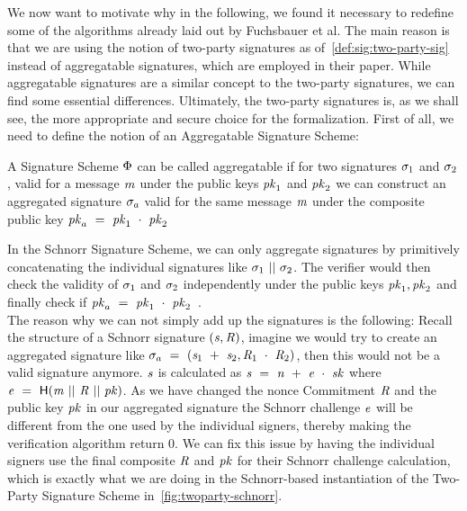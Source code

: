 We now want to motivate why in the following, we found it necessary to redefine some of the algorithms already laid out by Fuchsbauer et al.
The main reason is that we are using the notion of two-party signatures as of~\cref{def:sig:two-party-sig} instead of aggregatable signatures, which are employed in their paper.
While aggregatable signatures are a similar concept to the two-party signatures, we can find some essential differences.
Ultimately, the two-party signatures is, as we shall see, the more appropriate and secure choice for the formalization.
First of all, we need to define the notion of an Aggregatable Signature Scheme:
\begin{definition} \label{def:atom:aggsig}
    A Signature Scheme $\Phi$ can be called aggregatable if for two signatures $\sigma_1$ and $\sigma_2$, valid for a message $\mathit{m}$ under the public keys $\mathit{pk}_1$ and $\mathit{pk}_2$ we can construct an aggregated signature $\sigma_a$ valid for the same message $\mathit{m}$ under the composite public key $\mathit{pk}_a ~=~ \mathit{pk}_1 ~\cdot~ \mathit{pk}_2$
\end{definition}
In the Schnorr Signature Scheme, we can only aggregate signatures by primitively concatenating the individual signatures like $\sigma_1 ~||~ \sigma_2$.
The verifier would then check the validity of $\sigma_1$ and $\sigma_2$ independently under the public keys $\mathit{pk}_1, \mathit{pk}_2$ and finally check if $\mathit{pk}_a ~=~ \mathit{pk}_1 ~\cdot~ \mathit{pk}_2$~\cite{fuchsbauer2019aggregate}. \\
The reason why we can not simply add up the signatures is the following:
Recall the structure of a Schnorr signature $(\mathit{s}, \mathit{R})$, imagine we would try to create an aggregated signature like $\sigma_a ~=~ (\mathit{s}_1 ~+~ \mathit{s}_2, \mathit{R}_1 ~\cdot~ \mathit{R}_2)$, then this would not be a valid signature anymore.
$\mathit{s}$ is calculated as $\mathit{s} ~=~ \mathit{n} ~+~ \mathit{e} ~\cdot~ \mathit{sk}$ where $\mathit{e} ~=~ \mathsf{H} (\mathit{m} ~||~ \mathit{R} ~||~ \mathit{pk})$.
As we have changed the nonce Commitment $\mathit{R}$ and the public key $\mathit{pk}$ in our aggregated signature the Schnorr challenge $\mathit{e}$ will be different from the one used by the individual signers, thereby making the verification algorithm return 0.
We can fix this issue by having the individual signers use the final composite $\mathit{R}$ and $\mathit{pk}$ for their Schnorr challenge calculation, which is exactly what we are doing in the Schnorr-based instantiation of the Two-Party Signature Scheme in~\cref{fig:twoparty-schnorr}.
